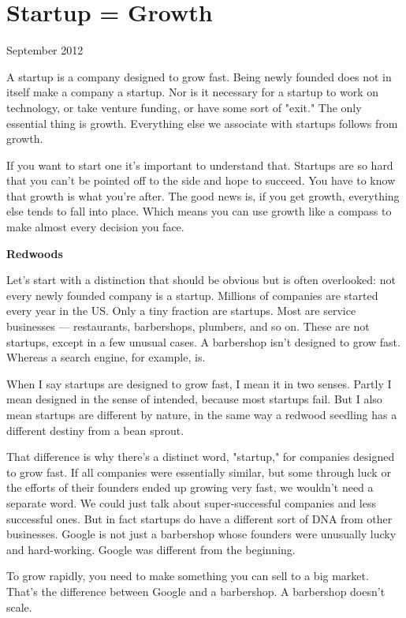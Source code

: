 \chapter{Startup = Growth}





September 2012

A startup is a company designed to grow fast.  Being newly founded
does not in itself make a company a startup.  Nor is it necessary
for a startup to work on technology, or take venture funding, or
have some sort of "exit."  The only essential thing is growth.
Everything else we associate with startups follows from growth.

If you want to start one it's important to understand that. Startups
are so hard that you can't be pointed off to the side and hope to
succeed.  You have to know that growth is what you're after.  The
good news is, if you get growth, everything else tends to fall into
place.  Which means you can use growth like a compass to make almost
every decision you face.


\textbf{Redwoods}

Let's start with a distinction that should be obvious but is often
overlooked: not every newly founded company is a startup.  Millions
of companies are started every year in the US.  Only a tiny fraction
are startups.  Most are service businesses --- restaurants, barbershops,
plumbers, and so on.  These are not startups, except in a few unusual
cases.  A barbershop isn't designed to grow fast.  Whereas a search
engine, for example, is.

When I say startups are designed to grow fast, I mean it in two
senses.  Partly I mean designed in the sense of intended, because
most startups fail.  But I also mean startups are different by
nature, in the same way a redwood seedling has a different destiny
from a bean sprout.

That difference is why there's a distinct word, "startup," for
companies designed to grow fast.  If all companies were essentially
similar, but some through luck or the efforts of their founders
ended up growing very fast, we wouldn't need a separate word.  We
could just talk about super-successful companies and less successful
ones.  But in fact startups do have a different sort of DNA from
other businesses.  Google is not just a barbershop whose founders
were unusually lucky and hard-working.  Google was different from
the beginning.

To grow rapidly, you need to make something you can sell to a big
market.  That's the difference between Google and a barbershop.  A
barbershop doesn't scale.

